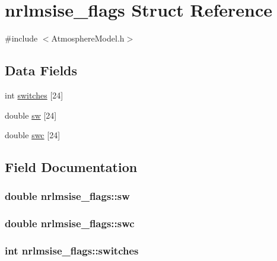 \hypertarget{structnrlmsise__flags}{\section{nrlmsise\+\_\+flags Struct Reference}
\label{structnrlmsise__flags}
}


{\ttfamily \#include $<$Atmosphere\+Model.\+h$>$}

\subsection*{Data Fields}
\begin{DoxyCompactItemize}
\item 
int \hyperlink{structnrlmsise__flags_a1e3801d7ac5abb5642db3c59baa503d5}{switches} \mbox{[}24\mbox{]}
\item 
double \hyperlink{structnrlmsise__flags_a9c181b93fd36d8cc3343d0c5b96050b4}{sw} \mbox{[}24\mbox{]}
\item 
double \hyperlink{structnrlmsise__flags_ad7c32ffaeaafb702cb59d024e26c0105}{swc} \mbox{[}24\mbox{]}
\end{DoxyCompactItemize}


\subsection{Field Documentation}
\hypertarget{structnrlmsise__flags_a9c181b93fd36d8cc3343d0c5b96050b4}{
\subsubsection[{sw}]{\setlength{\rightskip}{0pt plus 5cm}double nrlmsise\+\_\+flags\+::sw}}\label{structnrlmsise__flags_a9c181b93fd36d8cc3343d0c5b96050b4}
\hypertarget{structnrlmsise__flags_ad7c32ffaeaafb702cb59d024e26c0105}{
\subsubsection[{swc}]{\setlength{\rightskip}{0pt plus 5cm}double nrlmsise\+\_\+flags\+::swc}}\label{structnrlmsise__flags_ad7c32ffaeaafb702cb59d024e26c0105}
\hypertarget{structnrlmsise__flags_a1e3801d7ac5abb5642db3c59baa503d5}{
\subsubsection[{switches}]{\setlength{\rightskip}{0pt plus 5cm}int nrlmsise\+\_\+flags\+::switches}}\label{structnrlmsise__flags_a1e3801d7ac5abb5642db3c59baa503d5}



